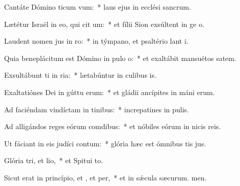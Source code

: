 \item Cantáte Dómino ticum vum:~* laus ejus in ecclési sancrum.
\item Lætétur Israël in eo, qui cit um:~* et fílii Sion exsúltent in ge o.
\item Laudent nomen jus in ro:~* in týmpano, et psaltério lant i.
\item Quia beneplácitum est Dómino in pulo o:~* et exaltábit mansuétos  satem.
\item Exsultábunt ti in ria:~* lætabúntur in culibus is.
\item Exaltatiónes Dei in gúttu erum:~* et gládii ancípites in máni erum.
\item Ad faciéndam vindíctam in tinibus:~* increpatines in pulis.
\item Ad alligándos reges eórum  comdibus:~* et nóbiles eórum in nicis reis.
\item Ut fáciant in eis judíci contum:~* glória hæc est ómnibus tis jus.
\item Glória tri, et lio,~* et Spitui to.
\item Sicut erat in princípio, et , et per,~* et in sǽcula sæcurum. men.
